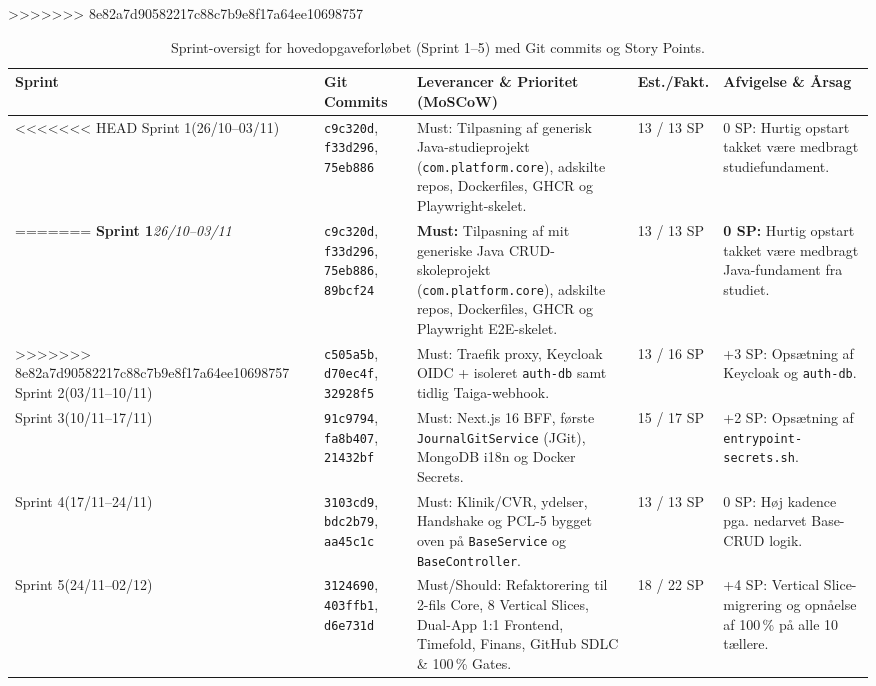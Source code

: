 \documentclass[11pt,a4paper]{article}
\begin{document}
\begin{table}[htbp]
\begin{table}[htbp]
\begin{table}[H]
>>>>>>> 8e82a7d90582217c88c7b9e8f17a64ee10698757
\centering
\footnotesize
\begin{tabularx}{\textwidth}{P{2.1cm} P{2.6cm} Y P{1.6cm} P{3.3cm}}
\toprule
\textbf{Sprint} & \textbf{Git Commits} & \textbf{Leverancer \& Prioritet (MoSCoW)} & \textbf{Est./Fakt.} & \textbf{Afvigelse \& Årsag} \\
\midrule
<<<<<<< HEAD
Sprint 1\newline (26/10--03/11) & \texttt{c9c320d}, \texttt{f33d296}, \texttt{75eb886} & Must: Tilpasning af generisk Java-studieprojekt (\texttt{com.platform.core}), adskilte repos, Dockerfiles, GHCR og Playwright-skelet. & 13 / 13 SP & 0 SP: Hurtig opstart takket være medbragt studiefundament. \\
=======
\textbf{Sprint 1}\newline \textit{26/10--03/11} & \texttt{c9c320d}, \texttt{f33d296}, \texttt{75eb886}, \texttt{89bcf24} & \textbf{Must:} Tilpasning af mit generiske Java CRUD-skoleprojekt (\texttt{com.platform.core}), adskilte repos, Dockerfiles, GHCR og Playwright E2E-skelet. & 13 / 13 SP & \textbf{0 SP:} Hurtig opstart takket være medbragt Java-fundament fra studiet. \\
>>>>>>> 8e82a7d90582217c88c7b9e8f17a64ee10698757
\addlinespace
Sprint 2\newline (03/11--10/11) & \texttt{c505a5b}, \texttt{d70ec4f}, \texttt{32928f5} & Must: Traefik proxy, Keycloak OIDC + isoleret \texttt{auth-db} samt tidlig Taiga-webhook. & 13 / 16 SP & +3 SP: Opsætning af Keycloak og \texttt{auth-db}. \\
\addlinespace
Sprint 3\newline (10/11--17/11) & \texttt{91c9794}, \texttt{fa8b407}, \texttt{21432bf} & Must: Next.js 16 BFF, første \texttt{JournalGitService} (JGit), MongoDB i18n og Docker Secrets. & 15 / 17 SP & +2 SP: Opsætning af \texttt{entrypoint-secrets.sh}. \\
\addlinespace
Sprint 4\newline (17/11--24/11) & \texttt{3103cd9}, \texttt{bdc2b79}, \texttt{aa45c1c} & Must: Klinik/CVR, ydelser, Handshake og PCL-5 bygget oven på \texttt{BaseService} og \texttt{BaseController}. & 13 / 13 SP & 0 SP: Høj kadence pga. nedarvet Base-CRUD logik. \\
\addlinespace
Sprint 5\newline (24/11--02/12) & \texttt{3124690}, \texttt{403ffb1}, \texttt{d6e731d} & Must/Should: Refaktorering til 2-fils Core, 8 Vertical Slices, Dual-App 1:1 Frontend, Timefold, Finans, GitHub SDLC \& 100\,\% Gates. & 18 / 22 SP & +4 SP: Vertical Slice-migrering og opnåelse af 100\,\% på alle 10 tællere. \\
\bottomrule
\end{tabularx}
\caption{Sprint-oversigt for hovedopgaveforløbet (Sprint 1--5) med Git commits og Story Points.}
\label{tab:sprint_log}
\end{table}


\end{table}
\end{table}
\end{document}
